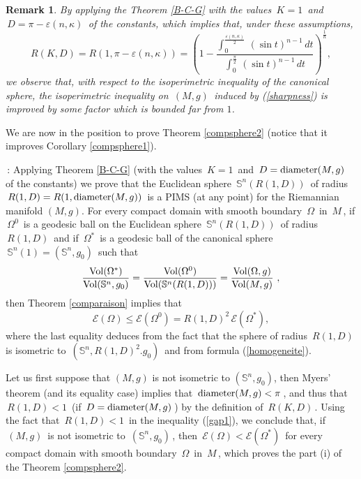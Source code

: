 \documentclass[11pt, reqno]{amsart}
\newtheorem{remarque}[theoreme]{Remark}
\theoremstyle{plain}
\begin{document}
\begin{remarque}\rm
By applying  the Theorem \ref{B-C-G} with the values $\,K = 1\,$ and $\, D = \pi - 
\varepsilon (n , \kappa)\,$ of the constants, which implies that, under these assumptions,
\begin{equation}\label{gap}
R(K,D)  = R(1, \pi - \varepsilon (n , \kappa) ) =  
\left( 1 - \dfrac{\int_0^{\frac{\varepsilon (n , \kappa)}{2}}\, (\sin t)^{n-1}\, dt}
{\int_0^{\frac{\pi}{2}}\, (\sin t)^{n-1}\, dt}\right)^{\frac{1}{n}}, 
\end{equation}
we observe that,  with respect to the isoperimetric inequality of the canonical sphere, the isoperimetric inequality
on $\, (M, g)\,$ induced by (\ref{sharpness}) is improved by some factor which is bounded far from $1$.
\end{remarque}

\vskip 0.3cm

We are now in the position to prove Theorem  \ref{compsphere2}
(notice that it improves Corollary \ref{compsphere1}).

\vskip 0.3cm

\,:  Applying Theorem \ref{B-C-G} (with the values $\,K = 1\,$ and $\, D = 
{\rm diameter} (M,g) \,$ of the constants) we prove that the Euclidean sphere 
$\, \mathbb S^n (R(1 , D))\,$ of radius 
$\,R(1, D) = R(1,{\rm diameter} (M,g))\,$ is a  PIMS (at any point) for the Riemannian manifold $(M,g)$. 
For every compact domain with smooth boundary $\,\Omega \,$ in 
$\, M \,$, if $\,\Omega^0\,$ is a geodesic ball on the Euclidean sphere 
$\, \mathbb S^n (R(1 , D))\,$ of radius $\,R(1 , D)\,$ and if $\,\Omega^*\,$ 
is a geodesic ball of  the canonical sphere 
$\, \mathbb S^n (1) = (\mathbb S^n , g_0 )\,$ such that 
$$\dfrac{{\rm Vol} (\Omega^*)}{{\rm Vol} (\mathbb S^n , g_0 )} =
\dfrac{{\rm Vol} (\Omega^0 )}{{\rm Vol} (\mathbb S^n (R(1 , D)))} 
= \dfrac{{\rm Vol} (\Omega , g )}{{\rm Vol} (M , g )}\ ,$$ 
then  Theorem \ref{comparaison} implies that 
\begin{equation}\label{gap1}
{\mathcal E} (\Omega) \le {\mathcal E} (\Omega^0) = R(1,D)^2 \,{\mathcal E} (\Omega^*),
\end{equation}
where the last equality deduces from the fact that the sphere of radius $\,R(1, D) \,$ is
isometric to $\,(\mathbb S^n , R(1,D)^2 . g_0 )\,$ and from
 formula (\ref{homogeneite}). 

Let us first suppose that $(M, g)$ is not isometric to $(\mathbb S^n , g_0 )$,
then Myers' theorem (and its equality case) implies that $\,{\rm diameter} (M,g) < \pi\,$, 
and thus that $\,R(1, D) < 1\,$ (if $\, D = {\rm diameter} (M,g) \,$)
by the definition of $\,R(K, D)\,$. Using the fact that $\,R(1, D) < 1\,$
in the inequality (\ref{gap1}), we conclude that, if $\, (M, g) \,$ is not isometric to 
$\,(\mathbb S^n , g_0 )\,$, then $\,{\mathcal E} (\Omega) < {\mathcal E} (\Omega^*)\,$ for every 
compact domain with smooth boundary $\,\Omega \,$ in $\, M \,$, which proves the
part (i) of the Theorem \ref{compsphere2}.
\end{document}
